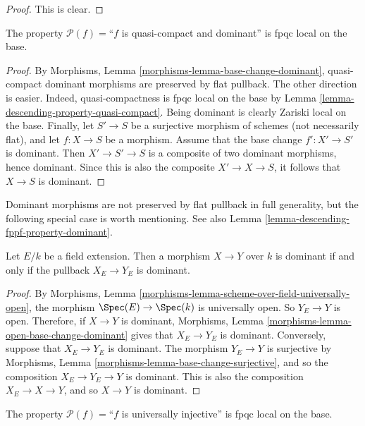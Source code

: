\begin{proof}
This is clear.
\end{proof}

\begin{lemma}
\label{lemma-descending-property-dominant}
The property $\mathcal{P}(f) =$``$f$ is quasi-compact and dominant''
is fpqc local on the base.
\end{lemma}

\begin{proof}
By Morphisms, Lemma \ref{morphisms-lemma-base-change-dominant},
quasi-compact dominant morphisms are preserved
by flat pullback. The other direction is easier.
Indeed, quasi-compactness is fpqc local on the base
by Lemma \ref{lemma-descending-property-quasi-compact}.
Being dominant is clearly Zariski local on the base.
Finally, let $S' \to S$ be a surjective morphism of schemes
(not necessarily flat),
and let $f : X \to S$ be a morphism. Assume that the base change
$f' : X' \to S'$ is dominant. Then $X' \to S'\to S$ is a composite
of two dominant morphisms, hence dominant. Since this is also
the composite $X' \to X \to S$, it follows that $X\to S$ is dominant.
\end{proof}

\noindent
Dominant morphisms are not preserved by flat pullback in full generality,
but the following special case is worth mentioning.
See also Lemma \ref{lemma-descending-fppf-property-dominant}.

\begin{lemma}
\label{lemma-descending-property-dominant-over-field}
Let $E/k$ be a field extension. Then a morphism
$X \to Y$ over $k$ is dominant if and only if
the pullback $X_E \to Y_E$ is dominant.
\end{lemma}

\begin{proof}
By Morphisms,
Lemma \ref{morphisms-lemma-scheme-over-field-universally-open},
the morphism $\Spec(E) \to \Spec(k)$
is universally open. So $Y_E \to Y$ is open.
Therefore, if $X \to Y$ is dominant, Morphisms,
Lemma \ref{morphisms-lemma-open-base-change-dominant} gives that
$X_E \to Y_E$ is dominant.
Conversely, suppose that $X_E \to Y_E$ is dominant.
The morphism $Y_E \to Y$ is surjective by Morphisms,
Lemma \ref{morphisms-lemma-base-change-surjective}, and so the composition
$X_E \to Y_E \to Y$ is dominant. This is also the composition
$X_E \to X \to Y$, and so $X \to Y$ is dominant.
\end{proof}

\begin{lemma}
\label{lemma-descending-property-universally-injective}
The property $\mathcal{P}(f) =$``$f$ is universally injective''
is fpqc local on the base.
\end{lemma}

